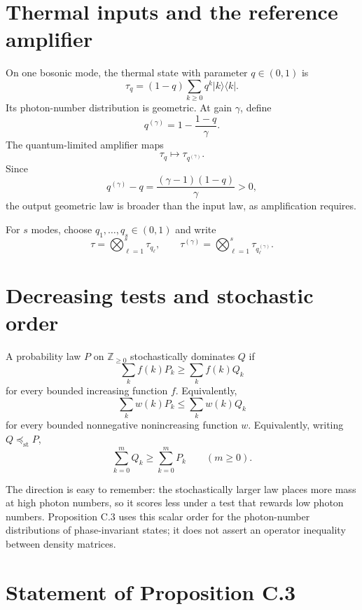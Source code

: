 \documentclass[11pt]{article}
\newcommand{\ketbra}[1]{|#1\rangle\!\langle #1|}
\begin{document}
\section{Thermal inputs and the reference amplifier}

On one bosonic mode, the thermal state with parameter $q\in(0,1)$ is
\begin{equation}\label{eq:thermal}
  \tau_q=(1-q)\sum_{k\geq0}q^k\ketbra{k}.
\end{equation}
Its photon-number distribution is geometric.  At gain $\gamma$, define
\begin{equation}\label{eq:qgamma}
  q^{(\gamma)}=1-\frac{1-q}{\gamma}.
\end{equation}
The quantum-limited amplifier maps
\[
  \tau_q\longmapsto\tau_{q^{(\gamma)}}.
\]
Since
\[
  q^{(\gamma)}-q
  =\frac{(\gamma-1)(1-q)}{\gamma}>0,
\]
the output geometric law is broader than the input law, as amplification
requires.

For $s$ modes, choose $q_1,\ldots,q_s\in(0,1)$ and write
\begin{equation}\label{eq:product-thermal}
  \tau=\bigotimes_{\ell=1}^s\tau_{q_\ell},
  \qquad
  \tau^{(\gamma)}
  =\bigotimes_{\ell=1}^s\tau_{q_\ell^{(\gamma)}}.
\end{equation}

\section{Decreasing tests and stochastic order}

A probability law $P$ on $\mathbb Z_{\geq0}$ stochastically dominates $Q$
if
\[
  \sum_k f(k)P_k\geq\sum_k f(k)Q_k
\]
for every bounded increasing function $f$.  Equivalently,
\begin{equation}\label{eq:decreasing-test}
  \sum_k w(k)P_k\leq\sum_k w(k)Q_k
\end{equation}
for every bounded nonnegative nonincreasing function $w$.
Equivalently, writing $Q\preceq_{\mathrm{st}}P$,
\[
  \sum_{k=0}^m Q_k\geq\sum_{k=0}^m P_k
  \qquad(m\geq0).
\]

The direction is easy to remember: the stochastically larger law places more
mass at high photon numbers, so it scores less under a test that rewards low
photon numbers.  Proposition C.3 uses this scalar order for the
photon-number distributions of phase-invariant states; it does not assert an
operator inequality between density matrices.

\section{Statement of Proposition C.3}
\end{document}
